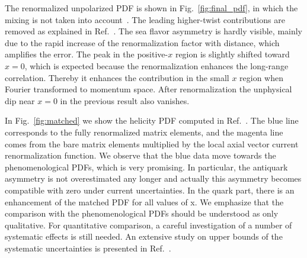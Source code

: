 \begin{itemize}
The renormalized unpolarized PDF is shown in Fig.~\ref{fig:final_pdf}, in which the mixing is not taken into
account~\cite{Chen:2017mzz}. The leading higher-twist contributions are removed as explained in 
Ref.~\cite{Chen:2016utp}. The sea flavor asymmetry is hardly visible, mainly due to the rapid increase 
of the renormalization factor with distance, which amplifies the error. The peak in the positive-$x$ 
region is slightly shifted toward $x{=}0$, which is expected because the renormalization enhances the 
long-range correlation. Thereby it enhances the contribution in the small $x$ region when Fourier 
transformed to momentum space. After renormalization the unphysical dip near $x=0$ in the previous 
result also vanishes. 


In Fig.~\ref{fig:matched} we show the helicity PDF computed in Ref.~\cite{Alexandrou:2017huk}. The blue line corresponds to
the fully renormalized matrix elements, and the magenta line comes from the bare matrix elements multiplied by the local axial vector 
current renormalization function. We observe that the blue data move towards the phenomenological PDFs, which is very 
promising. In particular, the antiquark asymmetry is not overestimated any longer and actually this asymmetry becomes 
compatible with zero under current uncertainties. In the quark part, there is an enhancement of the matched PDF for all 
values of x. We emphasize that the comparison with the phenomenological PDFs should be understood as only qualitative. 
For quantitative comparison, a careful investigation of a number of systematic effects is still needed. An extensive study 
on upper bounds of the systematic uncertainties is presented in Ref.~\cite{Alexandrou:2017huk}.
\bigskip
\begin{figure}[h!]
\centering

\end{figure}
\end{itemize}
